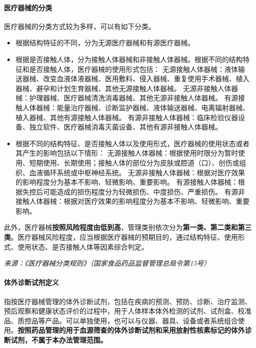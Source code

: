 \documentclass[cn,black,12pt,normal]{elegantnote}
\begin{document}
\paragraph{医疗器械的分类}
医疗器械的分类方式较为多样，可以有如下分类。
\begin{itemize}
    \item 根据结构特征的不同，分为无源医疗器械和有源医疗器械。
    \item 根据是否接触人体，分为接触人体器械和非接触人体器械。根据不同的结构特征和是否接触人体，医疗器械的使用形式包括：
        \subitem 无源接触人体器械：液体输送器械、改变血液体液器械、医用敷料、侵入器械、重复使用手术器械、植入器械、避孕和计划生育器械、其他无源接触人体器械。
        \subitem 无源非接触人体器械：护理器械、医疗器械清洗消毒器械、其他无源非接触人体器械。
        \subitem 有源接触人体器械：能量治疗器械、诊断监护器械、液体输送器械、电离辐射器械、植入器械、其他有源接触人体器械。
        \subitem 有源非接触人体器械：临床检验仪器设备、独立软件、医疗器械消毒灭菌设备、其他有源非接触人体器械。
    \item 根据不同的结构特征、是否接触人体以及使用形式，医疗器械的使用状态或者其产生的影响包括以下情形：
        \subitem 无源接触人体器械：根据使用时限分为暂时使用、短期使用、长期使用；接触人体的部位分为皮肤或腔道（口）、创伤或组织、血液循环系统或中枢神经系统。
        \subitem 无源非接触人体器械：根据对医疗效果的影响程度分为基本不影响、轻微影响、重要影响。
        \subitem 有源接触人体器械：根据失控后可能造成的损伤程度分为轻微损伤、中度损伤、严重损伤。
        \subitem 有源非接触人体器械：根据对医疗效果的影响程度分为基本不影响、轻微影响、重要影响。
\end{itemize}
此外，医疗器械\textbf{按照风险程度由低到高}，管理类别依次分为\textbf{第一类、第二类和第三类}。医疗器械风险程度，应当根据医疗器械的预期目的，通过结构特征、使用形式、使用状态、是否接触人体等因素综合判定。

\textit{来源：《医疗器械分类规则》（国家食品药品监督管理总局令第15号）}


\paragraph{体外诊断试剂定义}
指按医疗器械管理的体外诊断试剂，包括在疾病的预测、预防、诊断、治疗监测、预后观察和健康状态评价的过程中，用于人体样本体外检测的试剂、试剂盒、校准品、质控品等产品。可以单独使用，也可以与仪器、器具、设备或者系统组合使用。\textbf{按照药品管理的用于血源筛查的体外诊断试剂和采用放射性核素标记的体外诊断试剂，不属于本办法管理范围。}
\end{document}
